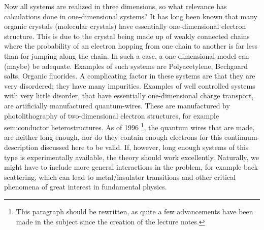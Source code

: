 Now all systems are realized in three dimensions, so what relevance has calculations done in one-dimensional systems?
It has long been known that many organic crystals (molecular crystals) have essentially one-dimensional electron structure. This is due to the crystal being made up of weakly connected chains where the probability of an electron hopping from one chain to another is far less than for jumping along the chain. In such a case, a one-dimensional model can (maybe) be adequate. Examples of such systems are Polyacetylene, Bechgaard salts, Organic fluorides. A complicating factor in these systems are that they are very disordered; they have many impurities.
Examples of well controlled systems with very little disorder, that have essentially one-dimensional charge transport, are artificially manufactured quantum-wires. These are manufactured by photolithography of two-dimensional electron structures, for example semiconductor heterostructures.
As of 1996 \footnote{This paragraph should be rewritten, as quite a few advancements have been made in the subject since the creation of the lecture notes.}, the quantum wires that are made, are neither long enough, nor do they contain enough electrons for this continuum-description discussed here to be valid. If, however, long enough systems of this type is experimentally available, the theory should work excellently. Naturally, we might have to include more general interactions in the problem, for example back scattering, which can lead to metal/insulator transitions and other critical phenomena of great interest in fundamental physics.